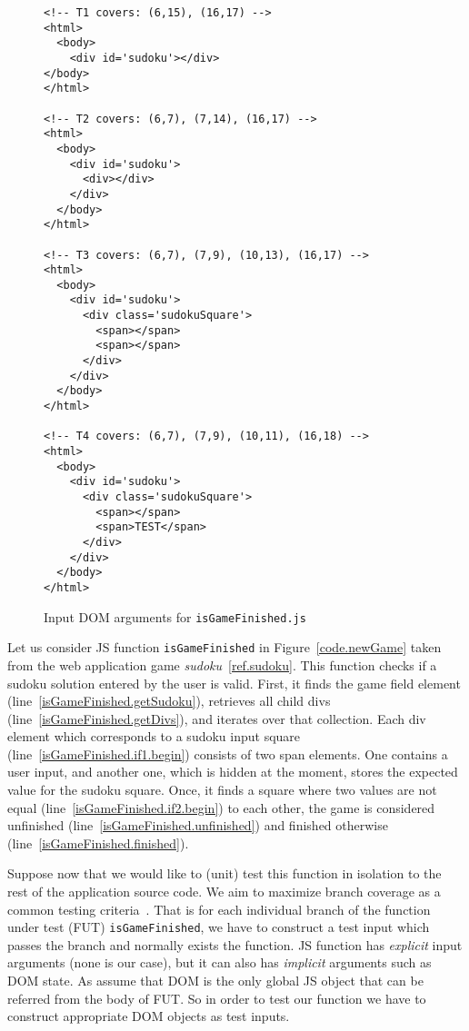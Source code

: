 \documentclass[sigconf]{acmart}
\begin{document}
\begin{figure}[t]
  \begin{lstlisting}[style=htmlcssjs, language=HTML5]
<!-- T1 covers: (6,15), (16,17) -->
<html>
  <body>
    <div id='sudoku'></div>
</body>
</html>

<!-- T2 covers: (6,7), (7,14), (16,17) -->
<html>
  <body>
    <div id='sudoku'>
      <div></div>
    </div>
  </body>
</html>

<!-- T3 covers: (6,7), (7,9), (10,13), (16,17) -->
<html>
  <body>
    <div id='sudoku'>
      <div class='sudokuSquare'>
        <span></span>
        <span></span>
      </div>
    </div>
  </body>
</html>

<!-- T4 covers: (6,7), (7,9), (10,11), (16,18) -->
<html>
  <body>
    <div id='sudoku'>
      <div class='sudokuSquare'>
        <span></span>
        <span>TEST</span>
      </div>
    </div>
  </body>
</html>
  \end{lstlisting}
  \caption{Input DOM arguments for \texttt{isGameFinished.js}}
  \label{fig.isGameFinished.tests}
\end{figure}

Let us consider JS function \texttt{isGameFinished} in Figure~\ref{code.newGame} taken from the web application game \emph{sudoku}~\ref{ref.sudoku}. This function checks if a sudoku solution entered by the user is valid. First, it finds the game field element (line~\ref{isGameFinished.getSudoku}), retrieves all child divs (line~\ref{isGameFinished.getDivs}), and iterates over that collection. Each div element which corresponds to a sudoku input square (line~\ref{isGameFinished.if1.begin}) consists of two span elements. One contains a user input, and another one, which is hidden at the moment, stores the expected value for the sudoku square. Once, it finds a square where two values are not equal (line~\ref{isGameFinished.if2.begin}) to each other, the game is considered unfinished (line~\ref{isGameFinished.unfinished}) and finished otherwise (line~\ref{isGameFinished.finished}).

Suppose now that we would like to (unit) test this function in isolation to the rest of the application source code. We aim to maximize branch coverage as a common testing criteria~\cite{why.this.common}. That is for each individual branch of the function under test (FUT) \texttt{isGameFinished}, we have to construct a test input which passes the branch and normally exists the function. JS function has \emph{explicit} input arguments (none is our case), but it can also has \emph{implicit} arguments such as DOM state. As assume that DOM is the only global JS object that can be referred from the body of FUT. So in order to test our function we have to construct appropriate DOM objects as test inputs.   
\end{document}

